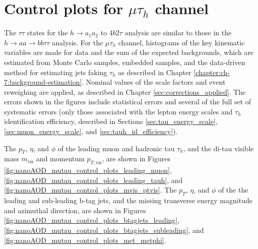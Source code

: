 \section{Control plots for \texorpdfstring{$\mu\tau_{h}$}{mutauh} channel}
\label{section:a1a2_control_plots}
The $\tau\tau$ states for the $h \rightarrow a_1 a_2$ to $4b2\tau$ analysis are similar to those in the $h\rightarrow aa \rightarrow bb\tau\tau$ analysis. For the $\mu\tau_{h}$ channel, histograms of the key kinematic variables are made for data and the sum of the expected backgrounds, which are estimated from Monte Carlo samples, embedded samples, and the data-driven method for estimating jets faking $\tau_{h}$ as described in Chapter \ref{chapter:ch-7:background-estimation}. Nominal values of the scale factors and event reweighing are applied, as described in Chapter \ref{sec:corrections_applied}. The errors shown in the figures include statistical errors and several of the full set of systematic errors (only those associated with the lepton energy scales and $\tau_{h}$ identification efficiency, described in Sections \ref{sec:tau_energy_scale}, \ref{sec:muon_energy_scale}, and \ref{sec:tauh_id_efficiency}). 

The $p_{T}$, $\eta$, and $\phi$ of the leading muon and hadronic tau $\tau_{h}$, and the di-tau visible mass $m_{\text{vis}}$ and momentum $p_{T, \text{vis}}$, are shown in Figures \ref{fig:nanoAOD_mutau_control_plots_leading_muon}, \ref{fig:nanoAOD_mutau_control_plots_leading_tauh}, and \ref{fig:nanoAOD_mutau_control_plots_mvis_ptvis}. The $p_{T}$, $\eta$, and $\phi$ of the the leading and sub-leading b-tag jets, and the missing transverse energy magnitude and azimuthal direction, are shown in Figures \ref{fig:nanoAOD_mutau_control_plots_btagjets_leading}, \ref{fig:nanoAOD_mutau_control_plots_btagjets_subleading}, and \ref{fig:nanoAOD_mutau_control_plots_met_metphi}.

